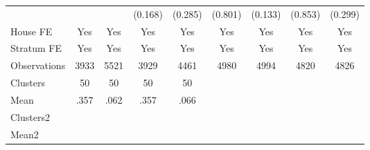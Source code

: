 {\begin{tabular}{l*{8}{c}}
                &                  &                  &  (0.168)         &  (0.285)         &  (0.801)         &  (0.133)         &  (0.853)         &  (0.299)         \\
House FE        &      Yes         &      Yes         &      Yes         &      Yes         &      Yes         &      Yes         &      Yes         &      Yes         \\
Stratum FE      &      Yes         &      Yes         &      Yes         &      Yes         &      Yes         &      Yes         &      Yes         &      Yes         \\
\midrule
Observations    &     3933         &     5521         &     3929         &     4461         &     4980         &     4994         &     4820         &     4826         \\
Clusters        &       50         &       50         &       50         &       50         &                  &                  &                  &                  \\
Mean            &     .357         &     .062         &     .357         &     .066         &                  &                  &                  &                  \\
Clusters2       &                  &                  &                  &                  &                  &                  &                  &                  \\
Mean2           &                  &                  &                  &                  &                  &                  &                  &                  \\
\bottomrule
\end{tabular}
}
